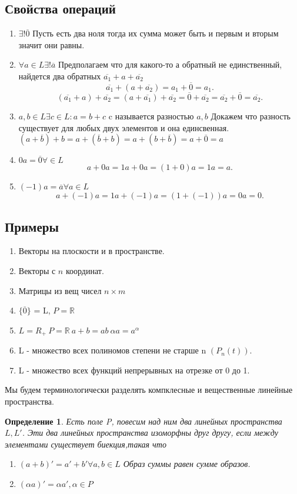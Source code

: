 \documentclass{scrartcl}
\newtheorem{definition}{Определение}
\begin{document}
\subsection{Свойства операций}
\begin{enumerate}
	\item $\exists ! \overline{0}$
	      Пусть есть два ноля тогда их сумма может быть и первым и вторым значит они равны.
	\item $\forall  a\in L \exists ! \overline{a}$
	      Предполагаем что для какого-то а обратный не единственный, найдется два обратных $\overline{a_1} + a + \overline{a_2}$
	      \[
		      \overline{a_1} + (a + \overline{a_2}) = a_1 + \overline{0} = a_1
		      .\]
	      \[
		      (\overline{a_1} + a) + \overline{a_2} = (a + \overline{a_1}) + \overline{a_{2}} = \overline{0} + \overline{a_2} = \overline{a_2} + \overline{0} = \overline{a_2}
		      .\]
	\item $a , b \in L \exists  c \in L : a  = b + c$ c называется разностью $a,b$
	      Докажем что разность существует для любых двух элементов и она единсвенная.
	      $(a + \overline{b}) + b = a + (\overline{b} + b) = a + (b + \overline{b}) = a + \overline{0} = a$
	\item $0a = \overline{0} \forall \in L$
	      \[
		      a + 0a = 1a + 0a = (1 + 0)a = 1a = a
		      .\]
	\item $(-1)a = \overline{a} \forall  a\in L$
	      \[
		      a + (-1)a = 1a + (-1)a = (1 + (-1))a = 0a = 0
		      .\]
\end{enumerate}
\subsection{Примеры}
\begin{enumerate}
	\item Векторы на плоскости и в пространстве.
	\item Векторы с $n$ координат.
	\item Матрицы из вещ чисел  $n \times m$
	\item  $\{\overline{0}\}$ = L, $P = \mathbb{R}$
	\item $L =R_{+} ~ P = \mathbb{R} ~ a + b = ab ~ \alpha a = a^{\alpha}$
	\item L - множество всех полиномов степени не старше n $(P_{n}(t))$.
	\item L - множество всех функций непрерывных на отрезке от 0 до 1.
\end{enumerate}
Мы будем терминологически разделять компклесные и вещественные линейные пространства.
\begin{definition}
	Есть поле P, повесим над ним два линейных пространства $L, L'$. Эти два линейных пространства
	изоморфны друг другу, если между элементами существует биекция,такая что
	\begin{enumerate}
		\item $(a + b)' = a' + b' \forall  a, b \in L$ Образ суммы равен сумме образов.
		\item $(\alpha a)' = \alpha a', \alpha \in P$
	\end{enumerate}
\end{definition}
\end{document}

